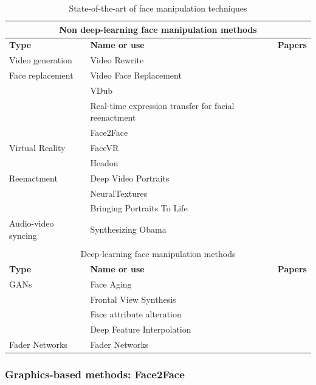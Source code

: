 \documentclass{article} %
\begin{document}
\begin{table}[h!]
\centering
\begin{tabular}{ |p{3cm}|p{5.5cm}|p{4cm}|  }
 \hline
 \multicolumn{3}{|c|}{Non deep-learning face manipulation methods} \\
 \hline
 \textbf{Type} & \textbf{Name or use} & \textbf{Papers} \\
 \hline
 Video generation & Video Rewrite & \cite{8014966} \\
 Face replacement & Video Face Replacement & \cite{dale2011video} \\
  & VDub & \cite{10.1111/cgf.12552} \\
  & Real-time expression transfer for facial reenactment & \cite{10.1145/2816795.2818056} \\
  & Face2Face & \cite{Thies2018Face2Face} \\
 Virtual Reality & FaceVR & \cite{10.1145/3182644} \\
  & Headon & \cite{Thies_2018} \\
 Reenactment & Deep Video Portraits & \cite{kim2018deep} \\
  & NeuralTextures & \cite{thies2019deferred} \\
  & Bringing Portraits To Life & \cite{elor2017bringingPortraits} \\
 Audio-video syncing & Synthesizing Obama & \cite{10.1145/3072959.3073640} \\
 & & \\
 \hline
 \multicolumn{3}{|c|}{Deep-learning face manipulation methods} \\
 \hline
 \textbf{Type} & \textbf{Name or use} & \textbf{Papers} \\
 \hline
 GANs & Face Aging & \cite{antipov2017face} \\
  & Frontal View Synthesis & \cite{8237529} \\
  & Face attribute alteration & \cite{article} \\
  & Deep Feature Interpolation & \cite{upchurch2017deep} \\
 Fader Networks & Fader Networks & \cite{lample2018fader} \\
 \hline
\end{tabular}
\caption{State-of-the-art of face manipulation techniques}
\end{table}

\subsubsection{Graphics-based methods: Face2Face}
\end{document}
